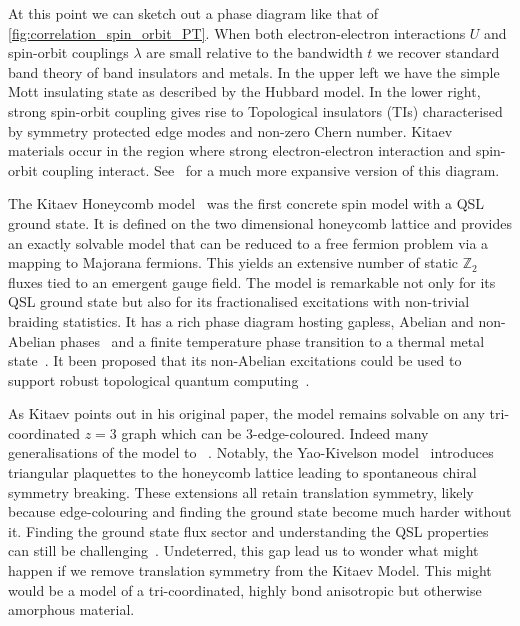 At this point we can sketch out a phase diagram like that of \cref{fig:correlation_spin_orbit_PT}. When both electron-electron interactions \(U\) and spin-orbit couplings \(\lambda\) are small relative to the bandwidth \(t\) we recover standard band theory of band insulators and metals. In the upper left we have the simple Mott insulating state as described by the Hubbard model. In the lower right, strong spin-orbit coupling gives rise to Topological insulators (TIs) characterised by symmetry protected edge modes and non-zero Chern number. Kitaev materials occur in the region where strong electron-electron interaction and spin-orbit coupling interact. See~\autocite{witczak-krempaCorrelatedQuantumPhenomena2014} for a much more expansive version of this diagram.

The Kitaev Honeycomb model~\autocite{kitaevAnyonsExactlySolved2006} was the first concrete spin model with a QSL ground state. It is defined on the two dimensional honeycomb lattice and provides an exactly solvable model that can be reduced to a free fermion problem via a mapping to Majorana fermions. This yields an extensive number of static \(\mathbb Z_2\) fluxes tied to an emergent gauge field. The model is remarkable not only for its QSL ground state but also for its fractionalised excitations with non-trivial braiding statistics. It has a rich phase diagram hosting gapless, Abelian and non-Abelian phases~\autocite{knolleDynamicsFractionalizationQuantum2015} and a finite temperature phase transition to a thermal metal state~\autocite{selfThermallyInducedMetallic2019}. It been proposed that its non-Abelian excitations could be used to support robust topological quantum computing~\autocite{kitaev_fault-tolerant_2003,freedmanTopologicalQuantumComputation2003,nayakNonAbelianAnyonsTopological2008}.

As Kitaev points out in his original paper, the model remains solvable on any tri-coordinated \(z=3\) graph which can be 3-edge-coloured. Indeed many generalisations of the model to ~\autocite{Baskaran2007,Baskaran2008,Nussinov2009,OBrienPRB2016,hermanns2015weyl}. Notably, the Yao-Kivelson model~\autocite{yaoExactChiralSpin2007} introduces triangular plaquettes to the honeycomb lattice leading to spontaneous chiral symmetry breaking. These extensions all retain translation symmetry, likely because edge-colouring and finding the ground state become much harder without it. Finding the ground state flux sector and understanding the QSL properties can still be challenging~\autocite{eschmann2019thermodynamics,Peri2020}. Undeterred, this gap lead us to wonder what might happen if we remove translation symmetry from the Kitaev Model. This might would be a model of a tri-coordinated, highly bond anisotropic but otherwise amorphous material.

